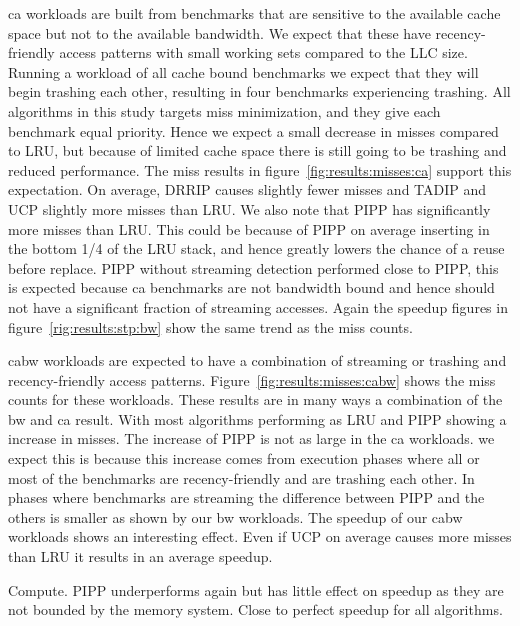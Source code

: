 ca workloads are built from benchmarks that are sensitive to the available cache space but not to the available bandwidth.
We expect that these have recency-friendly access patterns with small working sets compared to the LLC size.
Running a workload of all cache bound benchmarks we expect that they will begin trashing each other, resulting in four benchmarks experiencing trashing.
All algorithms in this study targets miss minimization, and they give each benchmark equal priority.
Hence we expect a small decrease in misses compared to LRU, but because of limited cache space there is still going to be trashing and reduced performance.
The miss results in figure~\ref{fig:results:misses:ca} support this expectation.
On average, DRRIP causes slightly fewer misses and TADIP and UCP slightly more misses than LRU.
We also note  that PIPP has significantly more misses than LRU.
This could be because of PIPP on average inserting in the bottom 1/4 of the LRU stack, and hence greatly lowers the chance of a reuse before replace.
PIPP without streaming detection performed close to PIPP, this is expected because ca benchmarks are not bandwidth bound and hence should not have a significant fraction of streaming accesses.
Again the speedup figures in figure~\ref{rig:results:stp:bw} show the same trend as the miss counts.

cabw workloads are expected to have a combination of streaming or trashing and recency-friendly access patterns.
Figure~\ref{fig:results:misses:cabw} shows the miss counts for these workloads. 
These results are in many ways a combination of the bw and ca result. 
With most algorithms performing as LRU and PIPP showing a increase in misses.
The increase of PIPP is not as large in the ca workloads.
we expect this is because this increase comes from execution phases where all or most of the benchmarks are recency-friendly and are trashing each other.
In phases where benchmarks are streaming the difference between PIPP and the others is smaller as shown by our bw workloads.
The speedup of our cabw workloads shows an interesting effect.
Even if UCP on average causes more misses than LRU it results in an average speedup.

Compute. PIPP underperforms again but has little effect on speedup as they are not bounded by the memory system. Close to perfect speedup for all algorithms.

